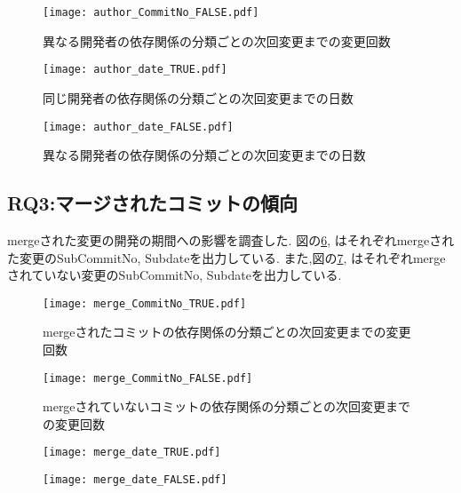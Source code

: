 \documentclass[submit,ses,noauthor]{ipsj} %
\begin{document}
\begin{figure}
\centering
\texttt{[image: author\_CommitNo\_FALSE.pdf]}
\caption{異なる開発者の依存関係の分類ごとの次回変更までの変更回数}
\label{fig:author_false_subNo} 
\end{figure}

\begin{figure}
\centering
\texttt{[image: author\_date\_TRUE.pdf]}
\caption{同じ開発者の依存関係の分類ごとの次回変更までの日数}
\label{fig:author_true_subdate} 
\end{figure}

\begin{figure}
\centering
\texttt{[image: author\_date\_FALSE.pdf]}
\caption{異なる開発者の依存関係の分類ごとの次回変更までの日数}
\label{fig:author_false_subdate} 
\end{figure}


\subsection{RQ3:マージされたコミットの傾向}
mergeされた変更の開発の期間への影響を調査した.
図の\ref{fig:merge_true_subNo},\label{fig:merge_true_subdate} はそれぞれmergeされた変更のSubCommitNo, Subdateを出力している.
また,図の\ref{fig:merge_false_subNo},\label{fig:merge_false_subdate} はそれぞれmergeされていない変更のSubCommitNo, Subdateを出力している.


\begin{figure}
\centering
\texttt{[image: merge\_CommitNo\_TRUE.pdf]}
\caption{mergeされたコミットの依存関係の分類ごとの次回変更までの変更回数}
\label{fig:merge_true_subNo} 
\end{figure}

\begin{figure}
\centering
\texttt{[image: merge\_CommitNo\_FALSE.pdf]}
\caption{mergeされていないコミットの依存関係の分類ごとの次回変更までの変更回数}
\label{fig:merge_false_subNo} 
\end{figure}



\begin{figure}
\centering
\texttt{[image: merge\_date\_TRUE.pdf]}
\caption{}
\label{fig:merge_true_subNo} 
\end{figure}

\begin{figure}
\centering
\texttt{[image: merge\_date\_FALSE.pdf]}
\caption{}
\label{fig:merge_false_subNo} 
\end{figure}
\end{document}
